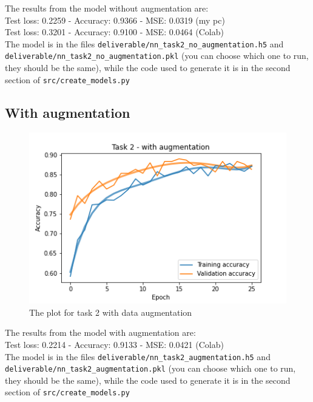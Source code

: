 \documentclass[11pt]{scrartcl}
\begin{document}
		The results from the model without augmentation are:\\
		
		Test loss: 0.2259 - Accuracy: 0.9366 - MSE: 0.0319 (my pc)\\
		Test loss: 0.3201 - Accuracy: 0.9100 - MSE: 0.0464 (Colab)\\

		The model is in the files \texttt{deliverable/nn\_task2\_no\_augmentation.h5} and\\ 
		\texttt{deliverable/nn\_task2\_no\_augmentation.pkl} (you can choose which one to run, they should be the same), while the code used to generate 
		it is in the second section of \texttt{src/create\_models.py}


	\subsection*{With augmentation}

		\begin{figure}[H]
			\centering
			\includegraphics[width=\textwidth]{src/plot_task2_augmentation.png}
			\caption{The plot for task 2 with data  augmentation}
			\label{fig:plot_T2_2}
		\end{figure}

		The results from the model with augmentation are:\\
		
		Test loss: 0.2214 - Accuracy: 0.9133 - MSE: 0.0421 (Colab)\\

		The model is in the files \texttt{deliverable/nn\_task2\_augmentation.h5} and\\ 
		\texttt{deliverable/nn\_task2\_augmentation.pkl} (you can choose which one to run, they should be the same), while the code used to generate 
		it is in the second section of \texttt{src/create\_models.py}\\
\end{document}
